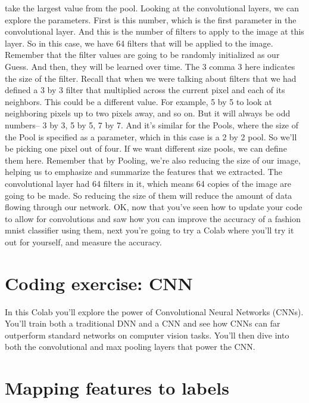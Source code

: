 take the largest value from the pool.
Looking at the convolutional layers, we can explore the parameters.
First is this number, which is the first parameter in the convolutional layer.
And this is the number of filters to apply to the image at this layer.
So in this case, we have 64 filters that will be applied to the image.
Remember that the filter values are going to be randomly initialized as our
Guess.
And then, they will be learned over time.
The 3 comma 3 here indicates the size of the filter.
Recall that when we were talking about filters that we had defined a 3
by 3 filter that multiplied across the current pixel and each
of its neighbors.
This could be a different value.
For example, 5 by 5 to look at neighboring pixels up to two pixels
away, and so on.
But it will always be odd numbers--
3 by 3, 5 by 5, 7 by 7.
And it's similar for the Pools, where the size of the Pool
is specified as a parameter, which in this case is a 2 by 2 pool.
So we'll be picking one pixel out of four.
If we want different size pools, we can define them here.
Remember that by Pooling, we're also reducing the size of our image,
helping us to emphasize and summarize the features that we extracted.
The convolutional layer had 64 filters in it,
which means 64 copies of the image are going to be made.
So reducing the size of them will reduce the amount
of data flowing through our network.
OK, now that you've seen how to update your code to allow for convolutions
and saw how you can improve the accuracy of a fashion mnist classifier using
them, next you're going to try a Colab
where you'll try it out for yourself, and measure the accuracy.

\section{Coding exercise: CNN}

In this Colab you’ll explore the power of Convolutional Neural Networks (CNNs). You’ll train both a traditional DNN and a CNN and see how CNNs can far outperform standard networks on computer vision tasks. You’ll then dive into both the convolutional and max pooling layers that power the CNN.


\section{Mapping features to labels}

